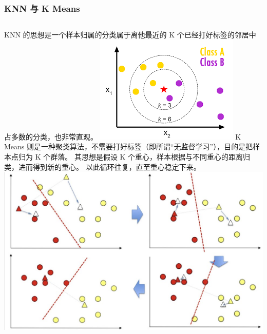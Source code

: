 \begin{frame}
    \frametitle{KNN 与 K Means}
    \begin{columns}
        KNN 的思想是一个样本归属的分类属于离他最近的 K 个已经打好标签的邻居中占多数的分类，也非常直观。
        \includegraphics[width=0.9\linewidth]{../lib/KNN.png}
        K Means 则是一种聚类算法，不需要打好标签（即所谓“无监督学习”），目的是把样本点归为 K 个群落。
        其思想是假设 K 个重心，样本根据与不同重心的距离归类，进而得到新的重心。
        以此循环往复，直至重心稳定下来。
        \includegraphics[width=0.9\linewidth]{../lib/kmeans.png}
    \end{columns}
\end{frame}
